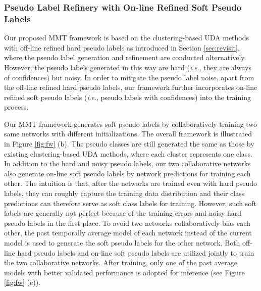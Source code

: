 \documentclass{article} \usepackage{iclr2020_conference,times}
\newcommand{\ie}{\textit{i}.\textit{e}., }
\begin{document}
\subsubsection{Pseudo Label Refinery with On-line Refined Soft Pseudo Labels}
\label{sec:soft}
\vspace{-5pt}


Our proposed MMT framework is based on the clustering-based UDA methods with off-line refined hard pseudo labels as introduced in Section \ref{sec:revisit}, where the pseudo label generation and refinement are conducted alternatively. However, the pseudo labels generated in this way are hard (\ie they are always of  confidences) but noisy. In order to mitigate the pseudo label noise, apart from the off-line refined hard pseudo labels, our framework further incorporates on-line refined soft pseudo labels (\ie pseudo labels with  confidences) into the training process. 


Our MMT framework generates soft pseudo labels by collaboratively training two same networks with different initializations. The overall framework is illustrated in Figure \ref{fig:fw} (b). The pseudo classes are still generated the same as those by existing clustering-based UDA methods, where each cluster represents one class. In addition to the hard and noisy pseudo labels, our two collaborative networks also generate on-line soft pseudo labels by network predictions for training each other. The intuition is that, after the networks are trained even with hard pseudo labels, they can roughly capture the training data distribution and their class predictions can therefore serve as soft class labels for training. However, such soft labels are generally not perfect because of the training errors and noisy hard pseudo labels in the first place.
To avoid two networks collaboratively bias each other, the past temporally average model of each network instead of the current model is used to generate the soft pseudo labels for the other network. Both off-line hard pseudo labels and on-line soft pseudo labels are utilized jointly to train the two collaborative networks. After training, only one of the past average models with better validated performance is adopted for inference (see Figure \ref{fig:fw} (c)).
\end{document}
